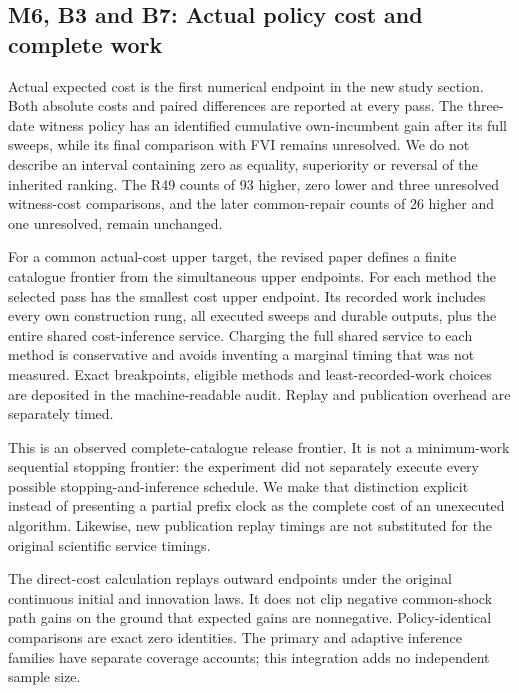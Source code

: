 \documentclass[ecta,nameyear,draft]{econsocart}
\begin{document}
\hypertarget{m6-b3-and-b7-actual-policy-cost-and-complete-work}{%
\subsection{M6, B3 and B7: Actual policy cost and complete
work}\label{m6-b3-and-b7-actual-policy-cost-and-complete-work}}

Actual expected cost is the first numerical endpoint in the new study
section. Both absolute costs and paired differences are reported at
every pass. The three-date witness policy has an identified cumulative
own-incumbent gain after its full sweeps, while its final comparison
with FVI remains unresolved. We do not describe an interval containing
zero as equality, superiority or reversal of the inherited ranking. The
R49 counts of 93 higher, zero lower and three unresolved witness-cost
comparisons, and the later common-repair counts of 26 higher and one
unresolved, remain unchanged.

For a common actual-cost upper target, the revised paper defines a
finite catalogue frontier from the simultaneous upper endpoints. For
each method the selected pass has the smallest cost upper endpoint. Its
recorded work includes every own construction rung, all executed sweeps
and durable outputs, plus the entire shared cost-inference service.
Charging the full shared service to each method is conservative and
avoids inventing a marginal timing that was not measured. Exact
breakpoints, eligible methods and least-recorded-work choices are
deposited in the machine-readable audit. Replay and publication overhead
are separately timed.

This is an observed complete-catalogue release frontier. It is not a
minimum-work sequential stopping frontier: the experiment did not
separately execute every possible stopping-and-inference schedule. We
make that distinction explicit instead of presenting a partial prefix
clock as the complete cost of an unexecuted algorithm. Likewise, new
publication replay timings are not substituted for the original
scientific service timings.

The direct-cost calculation replays outward endpoints under the original
continuous initial and innovation laws. It does not clip negative
common-shock path gains on the ground that expected gains are
nonnegative. Policy-identical comparisons are exact zero identities. The
primary and adaptive inference families have separate coverage accounts;
this integration adds no independent sample size.
\end{document}
